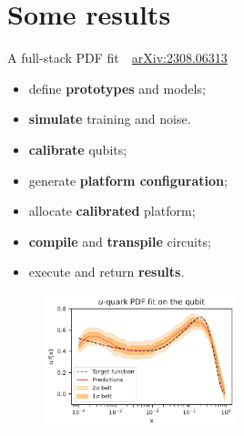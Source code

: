 \documentclass[8pt, xcolor={svgnames}, hyperref={linkcolor=black}]{beamer}
\begin{document}
\section{Some results}

\begin{frame}{A full-stack PDF fit \hfill \faBook\,\, \href{https://arxiv.org/abs/2308.06313}{arXiv:2308.06313}}

\begin{multicols}{2}
\pause
\hspace{2cm}
\begin{tcolorbox}[title=High level API: Qibo, colback=blue!20]
\begin{itemize}[noitemsep]
\small
   \item[\faCode] define \textbf{prototypes} and models;
   \item[\faCode] \textbf{simulate} training and noise.
\end{itemize}
\end{tcolorbox}
\pause
\begin{tcolorbox}[title=Calibration: Qibocal, colback=yellow!20]
\begin{itemize}[noitemsep]
\small
   \item[\faCrosshairs] \textbf{calibrate} qubits;
   \item[\faCrosshairs] generate \textbf{platform configuration};
\end{itemize}
\end{tcolorbox}
\pause
\begin{tcolorbox}[title=Execution: Qibolab, colback=red!20]
\begin{itemize}[noitemsep]
\small
   \item[\faCog] allocate \textbf{calibrated} platform;
   \item[\faCog] \textbf{compile} and \textbf{transpile} circuits;
   \item[\faCog] execute and return \textbf{results}.
\end{itemize}
\end{tcolorbox}
\pause
\begin{figure}  
    \includegraphics[width=0.5\textwidth]{figures/qpdf.pdf}

\end{figure}
\end{multicols}
\end{frame}
\end{document}
